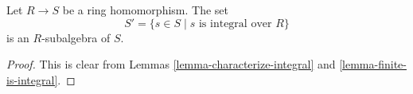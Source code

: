 \begin{lemma}
\label{lemma-integral-closure-is-ring}
Let $R \to S$ be a ring homomorphism.
The set
$$
S' = \{s \in S \mid s\text{ is integral over }R\}
$$
is an $R$-subalgebra of $S$.
\end{lemma}

\begin{proof}
This is clear from Lemmas \ref{lemma-characterize-integral}
and \ref{lemma-finite-is-integral}.
\end{proof}